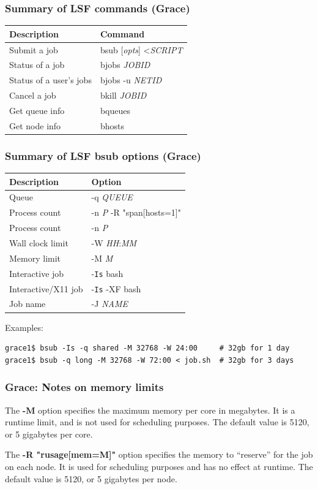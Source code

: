 \documentclass[10pt]{beamer}
\begin{document}
\begin{frame}
\frametitle{Summary of LSF commands (Grace)}
\begin{tabular}{|l|l|}
\hline
\textbf{Description} & \textbf{Command} \\
\hline
Submit a job & bsub [\textit{opts}] \textless \textit{SCRIPT} \\
\hline
Status of a job & bjobs \textit{JOBID} \\
\hline
Status of a user's jobs & bjobs -u \textit{NETID} \\
\hline
Cancel a job & bkill \textit{JOBID} \\
\hline
Get queue info & bqueues \\
\hline
Get node info & bhosts \\
\hline
\end{tabular}
\end{frame}

\begin{frame}[fragile]
\frametitle{Summary of LSF bsub options (Grace)}
\begin{tabular}{|l|l|}
\hline
\textbf{Description} & \textbf{Option} \\
\hline
Queue & -q \textit{QUEUE} \\
\hline
Process count & -n \textit{P} -R "span[hosts=1]" \\
\hline
Process count & -n \textit{P} \\
\hline
Wall clock limit & -W \textit{HH}:\textit{MM} \\
\hline
Memory limit & -M \textit{M} \\
\hline
Interactive job & -\texttt{Is} bash \\
\hline
Interactive/X11 job & -\texttt{Is} -XF bash \\
\hline
Job name & -J \textit{NAME} \\
\hline
\end{tabular}

\vskip10pt
Examples:
\begin{verbatim}
grace1$ bsub -Is -q shared -M 32768 -W 24:00     # 32gb for 1 day
grace1$ bsub -q long -M 32768 -W 72:00 < job.sh  # 32gb for 3 days
\end{verbatim}
\end{frame}

\begin{frame}
\frametitle{Grace: Notes on memory limits}
The \textbf{-M} option specifies the maximum memory per core in
megabytes.
It is a runtime limit, and is not used for scheduling purposes.
The default value is 5120, or 5 gigabytes per core.

\vskip10pt
The \textbf{-R "rusage[mem=M]"} option specifies the memory to ``reserve''
for the job on each node. It is used for scheduling purposes and has no
effect at runtime.
The default value is 5120, or 5 gigabytes per node.
\end{frame}
\end{document}
